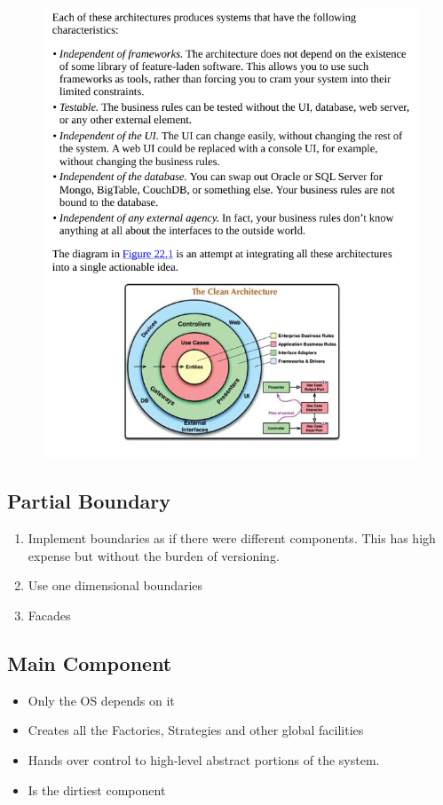 \documentclass[../Main.tex]{subfiles}
\begin{document}
\begin{figure}[H]
    \centering
    \includegraphics[width=1\linewidth]{Images/cleanarch/clean-architecture.png}
\end{figure}

\subsection{Partial Boundary}
\begin{enumerate}
    \item Implement boundaries as if there were different components. This has high expense but without the burden of versioning.
    \item Use one dimensional boundaries
    \item Facades
\end{enumerate}

\subsection{Main Component}
\begin{itemize}
    \item Only the OS depends on it
    \item Creates all the Factories, Strategies and other global facilities
    \item Hands over control to high-level abstract portions of the system.
    \item Is the dirtiest component
\end{itemize}
\end{document}
